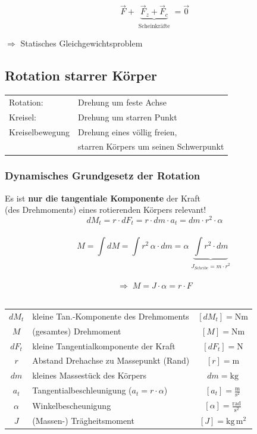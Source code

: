 			$$ \boxed{ \vec{F} + \underbrace{ \vec{F}_z + \vec{F}_c }_{\substack{\text{Scheinkräfte}}} = \vec{0} }$$ 
			
			$\Rightarrow$ Statisches Gleichgewichtsproblem

	\subsection{Rotation starrer Körper}
	
		\begin{tabular}{ll}
			Rotation: & Drehung um feste Achse \\
			Kreisel: & Drehung um starren Punkt \\
			Kreiselbewegung & Drehung eines völlig freien, \\
			&  starren Körpers um seinen Schwerpunkt \\
		\end{tabular}

		\subsubsection{Dynamisches Grundgesetz der Rotation}
			Es ist \textbf{nur die tangentiale Komponente} der Kraft \\
			(des Drehmoments) eines rotierenden Körpers relevant! \\
			\vspace{-0.2cm}
			$$dM_t = r \cdot dF_t = r \cdot dm \cdot a_t = dm \cdot r^2 \cdot \alpha$$ \\
			\vspace{-0.2cm}
			$$ \boxed{ M = \int dM = \int r^2 \, \alpha \cdot dm = \alpha  \underbrace{  \int r^2 \cdot dm }_{\substack{J_{Scheibe} = m \cdot r^2}} }$$ \
			\vspace{-0.2cm}
			$$ \boxed{ \Rightarrow \; M = J \cdot \alpha = r \cdot F} $$ \\
			\vspace{-0.2cm}
			\begin{tabular}{c l c}
				$dM_t$ & kleine Tan.-Komponente des Drehmoments & $[dM_t] = \mathrm{Nm}$ \\
				$M$ & (gesamtes) Drehmoment & $[M] = \mathrm{Nm}$ \\
				$dF_t$ & kleine Tangentialkomponente der Kraft & $[dF_t] = \mathrm{N}$ \\
				$r$ & Abstand Drehachse zu Massepunkt (Rand) & $[r] = \mathrm{m}$ \\
				$dm$ & kleines Massestück des Körpers & $dm = \mathrm{kg}$ \\
				$a_t$ & Tangentialbeschleunigung ($a_t = r \cdot \alpha$) & $[a_t] = \mathrm{\frac{m}{s^2}}$ \\
				$\alpha$ & Winkelbescheunigung & $[\alpha] = \mathrm{\frac{rad}{s^2}}$ \\
				$J$ & (Massen-) Trägheitsmoment & $[J] = \mathrm{kg \, m^2}$ \\
			\end{tabular}

